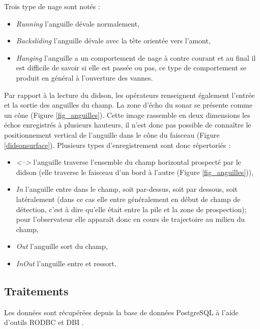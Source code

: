 \documentclass[11pt,twocolumn,titlepage,twoside]{article}
\begin{document}
Trois type de nage sont notés : 
\begin{itemize}
\item \emph{Running} l'anguille dévale normalement,
\item \emph{Backsliding} l'anguille dévale avec la tête orientée vers l'amont,
\item \emph{Hanging} l'anguille a un comportement de nage à contre courant et au
final il est difficile de savoir si elle est passée ou pas, ce type de
comportement se produit en général à l'ouverture des vannes.
\end{itemize}
Par rapport à la lecture du didson, les opérateurs renseignent également
l'entrée et la sortie des anguilles du champ. La zone d'écho du sonar se
présente comme un cône (Figure \ref{fig_anguilles}). Cette image rassemble en
deux dimensions les échos enregistrés à plusieurs hauteurs, il n'est donc pas
possible de connaître le positionnement vertical de l'anguille dans le cône du
faisceau (Figure \ref{didsonsurface}). Plusieurs types d'enregistrement sont
donc répertoriés :
\begin{itemize}
\item \emph{<-->} l'anguille traverse l'ensemble du champ horizontal prospecté
par le didson (elle traverse le faisceau d'un bord à l'autre (Figure
\ref{fig_anguilles})),
\item \emph{In} l'anguille entre dans le champ, soit par-dessus, soit par
dessous, soit latéralement (dans ce cas elle entre généralement en début de
champ de détection, c'est à dire qu'elle était entre la pile et la zone de
prospection); pour l'observateur elle apparaît donc en cours de trajectoire au milieu du champ,
\item \emph{Out} l'anguille sort du champ,
\item \emph{InOut} l'anguille entre et ressort.
\end{itemize}

\subsection{Traitements}

\label{partraitement}
Les données sont récupérées depuis la base de données PostgreSQL à l'aide
d'outils RODBC et DBI
\citep{conway_RPostgreSQLInterfacePostgreSQL_2021, wickham_2022}.
\end{document}
